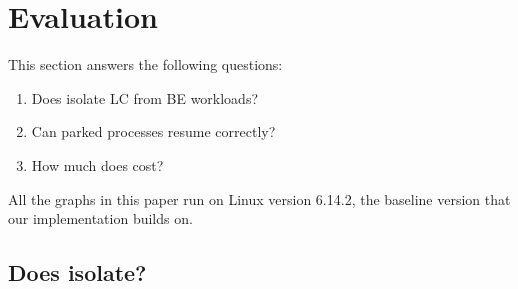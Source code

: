 \section{Evaluation}
\label{s:eval}

This section answers the following questions:
\begin{enumerate}
    \item Does \schedbe{} isolate LC from BE workloads?
    \item Can parked processes resume correctly?
    \item How much does \schedbe{} cost?
\end{enumerate}

All the graphs in this paper run on Linux version 6.14.2, the baseline version
that our implementation builds on.

\subsection{Does \schedbe{} isolate?}

